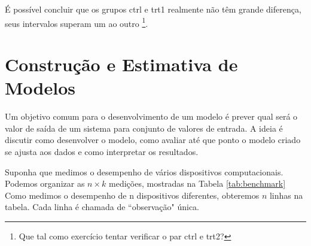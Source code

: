 \documentclass[article]{memoir}
\begin{document}
É possível concluir que  os grupos ctrl e trt1 realmente não têm grande diferença, seus intervalos superam um ao outro \footnote{Que tal como exercício tentar verificar o par ctrl e trt2?}. 


\section{Construção e Estimativa de Modelos}

Um objetivo comum para o desenvolvimento de um modelo é prever qual será o valor de saída de um sistema para conjunto de valores de entrada. A ideia é discutir como desenvolver o modelo, como avaliar
até que ponto o modelo criado se ajusta aos dados e como interpretar os resultados. 

Suponha que medimos o desempenho de vários dispositivos computacionais. Podemos organizar  as $n \times k$ medições, mostradas na Tabela  \ref{tab:benchmark} Como medimos o desempenho de n dispositivos diferentes, obteremos $n$ linhas na tabela. Cada linha é chamada de ``observação" única.
\end{document}
